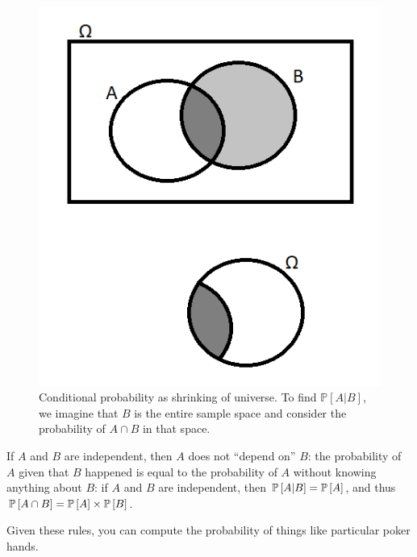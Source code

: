 \begin{figure}
\centering
\includegraphics[]{figure/conditional-probability.png}
\caption{Conditional probability as shrinking of universe. To find $\mathbb{P}[A|B]$,
we imagine that $B$ is the entire sample space and consider the probability of
$A \cap B$ in that space.}
\label{fig:conditional-probability}
\end{figure}

If $A$ and $B$ are independent, then $A$ does not ``depend on'' $B$: the
probability of $A$ given that $B$ happened is equal to the probability of $A$
without knowing anything about $B$: if $A$ and $B$ are independent, then
$\mathbb{P}\left[{A | B}\right] = \mathbb{P}\left[{A}\right]$, and thus $\mathbb{P}\left[{A \cap B}\right] = \mathbb{P}\left[{A}\right] \times
\mathbb{P}\left[{B}\right]$.

Given these rules, you can compute the probability of things like particular poker
hands.